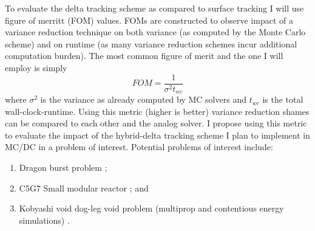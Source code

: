 To evaluate the delta tracking scheme as compared to surface tracking I will use figure of merritt (FOM) values.
FOMs are constructed to observe impact of a variance reduction technique on both variance (as computed by the Monte Carlo scheme) and on runtime (as many variance reduction schemes incur additional computation burden).
The most common figure of merit and the one I will employ is simply
\begin{equation}
    FOM = \frac{1}{\sigma^2 t_{wc}}
\end{equation}
where $\sigma^2$ is the variance as already computed by MC solvers and $t_{wc}$ is the total wall-clock-runtime.
Using this metric (higher is better) variance reduction shames can be compared to each other and the analog solver.
I propose using this metric to evaluate the impact of the hybrid-delta tracking scheme I plan to implement in MC/DC in a problem of interest.
Potential problems of interest include:
\begin{enumerate}
    \item Dragon burst problem \cite{kimpland2021dragon};
    \item C5G7 Small modular reactor \cite{jia_hou_oecdnea_2017}; and
    \item Kobyashi void dog-leg void problem (multiprop and contentious energy simulations) \cite{Kobayashi2001}.
\end{enumerate}
